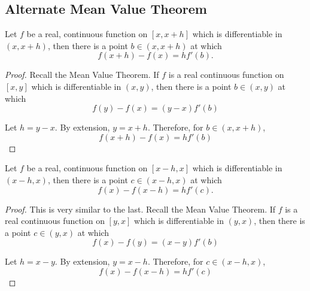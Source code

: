 \documentclass[11pt]{article}
\begin{document}
    \subsection{Alternate Mean Value Theorem}
        \label{thm:0.4}
        Let $f$ be a real, continuous function on $[x, x + h]$ which is differentiable in $(x, x + h)$, then there is a point $b \in (x, x + h)$ at which
        \begin{equation}
            f(x + h) - f(x) = h f'(b).
        \end{equation}
        \begin{proof}
            Recall the Mean Value Theorem.
            If $f$ is a real continuous function on $[x, y]$ which is differentiable in $(x, y)$, then there is a point $b \in (x, y)$ at which
            \begin{equation}
                f(y) - f(x) = (y - x) f'(b)
            \end{equation}

            Let $h = y - x$.
            By extension, $y = x + h$.
            Therefore, for $b \in (x, x + h)$,
            \begin{equation}
                f(x + h) - f(x) = h f'(b)
            \end{equation}
        \end{proof}

        Let $f$ be a real, continuous function on $[x - h, x]$ which is differentiable in $(x - h, x)$, then there is a point $c \in (x - h, x)$ at which
        \begin{equation}
            f(x) - f(x - h) = h f'(c).
        \end{equation}
        \begin{proof}
            This is very similar to the last.
            Recall the Mean Value Theorem.
            If $f$ is a real continuous function on $[y, x]$ which is differentiable in $(y, x)$, then there is a point $c \in (y, x)$ at which
            \begin{equation}
                f(x) - f(y) = (x - y) f'(b)
            \end{equation}

            Let $h = x - y$.
            By extension, $y = x - h$.
            Therefore, for $c \in (x - h, x)$,
            \begin{equation}
                f(x) - f(x - h) = h f'(c)
            \end{equation}
        \end{proof}
\end{document}
